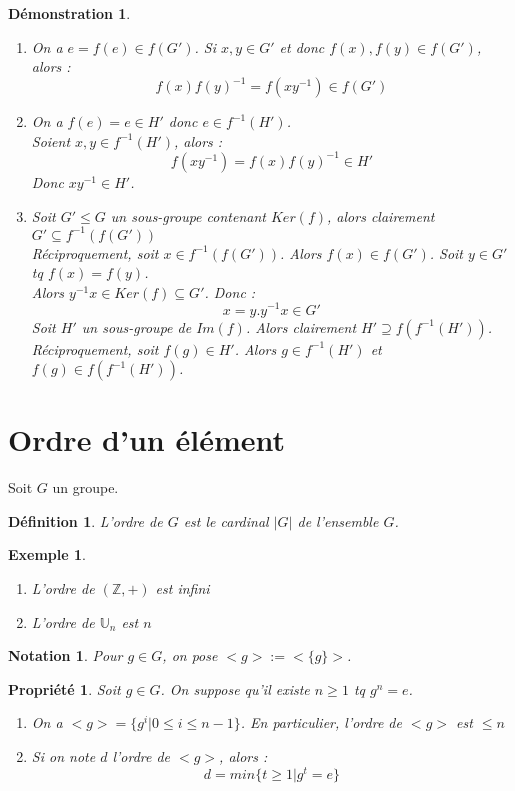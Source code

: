 \documentclass[a4paper, oneside]{report}
\theoremstyle{break}
\newtheorem{defi}[thm]{Définition}
\newtheorem{propr}[thm]{Propriété}
\newtheorem{nota}[thm]{Notation}
\newtheorem{exem}[thm]{Exemple}
\newtheorem*{demo}{Démonstration}
\newcommand{\Z}{\mathbb{Z}}
\newcommand{\U}{\mathbb{U}}
\begin{document}
\begin{demo}
	\begin{enumerate}
		\item On a $e=f(e)\in f(G')$. Si $x,y\in G'$ et donc $f(x),f(y)\in f(G')$, alors :
		$$f(x)f(y)^{-1}=f(xy^{-1})\in f(G')$$
		
		\item On a $f(e)=e \in H'$ donc $e\in f^{-1}(H')$.\\
		Soient $x,y\in f^{-1}(H')$, alors :
		$$f(xy^{-1})=f(x)f(y)^{-1} \in H'$$
		Donc $xy^{-1}\in H'$.
		
		\item Soit $G'\leq G$ un sous-groupe contenant $Ker(f)$, alors clairement $G'\subseteq f^{-1}(f(G'))$\\
		Réciproquement, soit $x\in f^{-1}(f(G'))$. Alors $f(x)\in f(G')$. Soit $y\in G'$ tq $f(x)=f(y)$.\\
		Alors $y^{-1}x\in Ker(f)\subseteq G'$. Donc :
		$$x = y.y^{-1}x \in G'$$
		Soit $H'$ un sous-groupe de $Im(f)$. Alors clairement $H'\supseteq f(f^{-1}(H'))$.\\
		Réciproquement, soit $f(g)\in H'$. Alors $g\in f^{-1}(H')$ et $f(g)\in f(f^{-1}(H'))$.
	\end{enumerate}
\end{demo}

\section{Ordre d'un élément}
Soit $G$ un groupe.\\

\begin{defi}
	L'ordre de $G$ est le cardinal $|G|$ de l'ensemble $G$.
\end{defi}

\begin{exem}
	\begin{enumerate}
		\item L'ordre de $(\Z,+)$ est infini
		\item L'ordre de $\U_n$ est $n$
	\end{enumerate}
\end{exem}

\begin{nota}
	Pour $g\in G$, on pose $<g> := <\{ g \}>$.
\end{nota}

\begin{propr}
	Soit $g\in G$. On suppose qu'il existe $n\geq 1$ tq $g^n=e$.
	\begin{enumerate}
		\item On a $<g> = \{g^i | 0\leq i \leq n-1 \}$. En particulier, l'ordre de $<g>$ est $\leq n$
		\item Si on note $d$ l'ordre de $<g>$, alors :
		$$d=min\{t\geq 1 | g^t=e \}$$
	\end{enumerate}
\end{propr}
\end{document}
